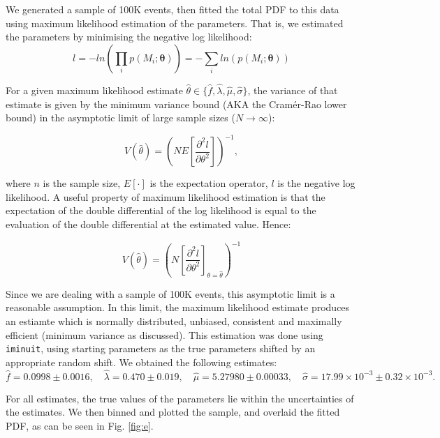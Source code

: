 \documentclass{article}
\begin{document}
We generated a sample of 100K events, then fitted the total PDF to this data using maximum likelihood estimation of the parameters. That is, we estimated the parameters by minimising the negative log likelihood:
\begin{equation}
l
= -ln\left(\prod_i p(M_i; \boldsymbol{\theta})\right)
= -\sum_i ln(p(M_i; \boldsymbol{\theta}))
\label{eq:nll}
\end{equation}

For a given maximum likelihood estimate $\hat{\theta} \in \{\hat{f}, \hat{\lambda}, \hat{\mu}, \hat{\sigma} \}$, the variance of that estimate is given by the minimum variance bound (AKA the Cramér-Rao lower bound) in the asymptotic limit of large sample sizes ($N \to \infty$):

\begin{equation}
V(\hat{\theta}) 
= \left( {NE\left[\frac{{\partial^2}l}{{\partial\theta^2}}\right]} \right)^{-1},
\label{eq:varbound}
\end{equation}

where $n$ is the sample size, $E[\cdot]$ is the expectation operator, $l$ is the negative log likelihood. A useful property of maximum likelihood estimation is that the expectation of the double differential of the log likelihood is equal to the evaluation of the double differential at the estimated value. Hence:

\begin{equation}
V(\hat{\theta}) = \left(N\left[\frac{{\partial^2}l}{{\partial\theta^2}}\right]_{\theta=\hat{\theta}} \right)^{-1}
\label{eq:minvar}
\end{equation}

Since we are dealing with a sample of 100K events, this asymptotic limit is a reasonable assumption. In this limit, the maximum likelihood estimate produces an estiamte which is normally distributed, unbiased, consistent and maximally efficient (minimum variance as discussed). This estimation was done using \texttt{iminuit}, using starting parameters as the true parameters shifted by an appropriate random shift. We obtained the following estimates:
\[ \hat{f} = 0.0998 \pm 0.0016, \quad \hat{\lambda} = 0.470 \pm 0.019, \quad \hat{\mu} = 5.27980 \pm 0.00033, \quad \hat{\sigma} = 17.99 \times 10^{-3} \pm 0.32 \times 10^{-3}. \]

For all estimates, the true values of the parameters lie within the uncertainties of the estimates. We then binned and plotted the sample, and overlaid the fitted PDF, as can be seen in Fig. \ref{fig:e}.
\end{document}
